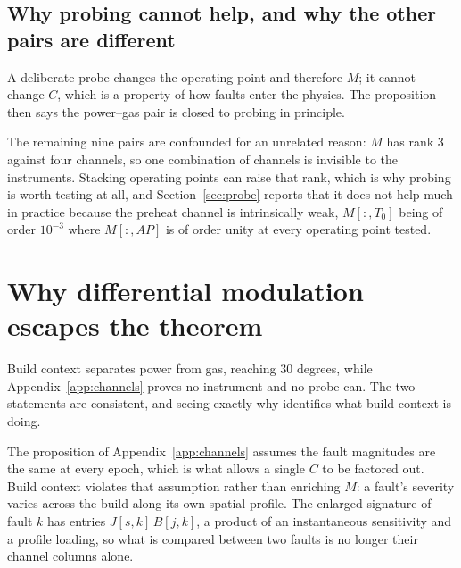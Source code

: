 \documentclass[preprint,12pt]{elsarticle}
\begin{document}
\subsection{Why probing cannot help, and why the other pairs are different}

A deliberate probe changes the operating point and therefore $M$; it cannot
change $C$, which is a property of how faults enter the physics. The
proposition then says the power--gas pair is closed to probing in principle.

The remaining nine pairs are confounded for an unrelated reason: $M$ has rank 3
against four channels, so one combination of channels is invisible to the
instruments. Stacking operating points can raise that rank, which is why probing
is worth testing at all, and Section~\ref{sec:probe} reports that it does not
help much in practice because the preheat channel is intrinsically weak,
$M[:,T_0]$ being of order $10^{-3}$ where $M[:,AP]$ is of order unity at every
operating point tested.


\section{Why differential modulation escapes the theorem}
\label{app:modulation}

Build context separates power from gas, reaching 30 degrees, while
Appendix~\ref{app:channels} proves no instrument and no probe can. The two
statements are consistent, and seeing exactly why identifies what build context
is doing.

The proposition of Appendix~\ref{app:channels} assumes the fault magnitudes are
the same at every epoch, which is what allows a single $C$ to be factored out.
Build context violates that assumption rather than enriching $M$: a fault's
severity varies across the build along its own spatial profile. The enlarged
signature of fault $k$ has entries $J[s,k]\,B[j,k]$, a product of an
instantaneous sensitivity and a profile loading, so what is compared between two
faults is no longer their channel columns alone.
\end{document}
